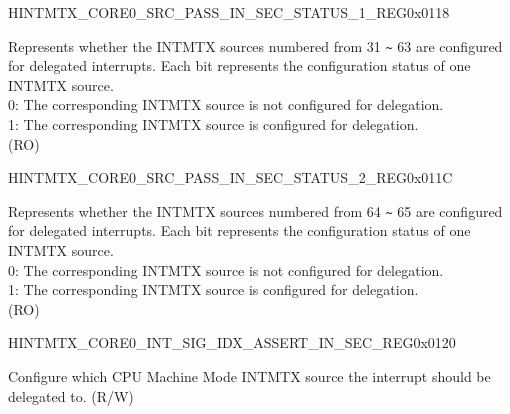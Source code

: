 \begin{register}{H}{INTMTX\_CORE0\_SRC\_PASS\_IN\_SEC\_STATUS\_1\_REG}{0x0118}\label{regdesc:INTMTXCORE0SRCPASSINSECSTATUS1REG}
%
\regnewline%
\begin{regdesc}\begin{reglist}
\label{fielddesc:INTMTXCORE0INTSRCPASSINSECSTATUS1}\item [INTMTX\_CORE0\_INT\_SRC\_PASS\_IN\_SEC\_STATUS\_1] Represents whether the INTMTX sources numbered from 31 \verb+~+ 63 are configured for delegated interrupts. Each bit represents the configuration status of one INTMTX source.\\

0: The corresponding INTMTX source is not configured for delegation.\\
1: The corresponding INTMTX source is configured for delegation.\\ (RO)
\end{reglist}\end{regdesc}
\end{register}


\begin{register}{H}{INTMTX\_CORE0\_SRC\_PASS\_IN\_SEC\_STATUS\_2\_REG}{0x011C}\label{regdesc:INTMTXCORE0SRCPASSINSECSTATUS2REG}
%
%
\regnewline%
\begin{regdesc}\begin{reglist}
\label{fielddesc:INTMTXCORE0INTSRCPASSINSECSTATUS2}\item [INTMTX\_CORE0\_INT\_SRC\_PASS\_IN\_SEC\_STATUS\_2] Represents whether the INTMTX sources numbered from 64 \verb+~+ 65 are configured for delegated interrupts. Each bit represents the configuration status of one INTMTX source.\\

0: The corresponding INTMTX source is not configured for delegation.\\
1: The corresponding INTMTX source is configured for delegation.\\ (RO)
\end{reglist}\end{regdesc}
\end{register}


\begin{register}{H}{INTMTX\_CORE0\_INT\_SIG\_IDX\_ASSERT\_IN\_SEC\_REG}{0x0120}\label{regdesc:INTMTXCORE0INTSIGIDXASSERTINSECREG}
%
%
\regnewline%
\begin{regdesc}\begin{reglist}
\label{fielddesc:INTMTXCORE0INTSIGIDXASSERTINSEC}\item [INTMTX\_CORE0\_INT\_SIG\_IDX\_ASSERT\_IN\_SEC] Configure which CPU Machine Mode INTMTX source the interrupt should be delegated to. (R/W)
\end{reglist}\end{regdesc}
\end{register}


